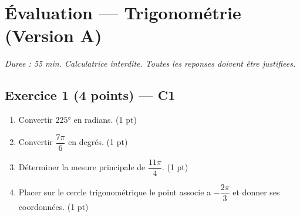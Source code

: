 

\section*{Évaluation — Trigonométrie (Version A)}
\textit{Duree : 55 min. Calculatrice interdite. Toutes les reponses doivent être justifiees.}

\bigskip

\subsection*{Exercice 1 \hfill (4 points) — C1}

\begin{enumerate}
  \item Convertir $225°$ en radians. \hfill (1 pt)
  \item Convertir $\dfrac{7\pi}{6}$ en degrés. \hfill (1 pt)
  \item Déterminer la mesure principale de $\dfrac{11\pi}{4}$. \hfill (1 pt)
  \item Placer sur le cercle trigonométrique le point associe a $-\dfrac{2\pi}{3}$ et donner ses coordonnées. \hfill (1 pt)
\end{enumerate}

